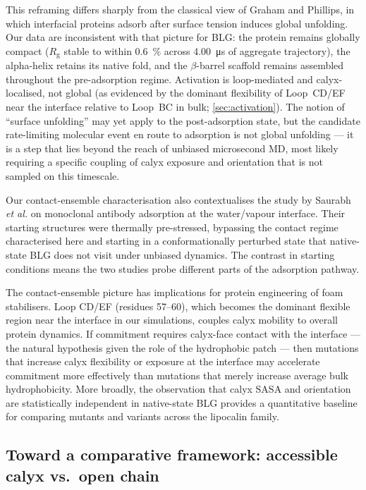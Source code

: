 \documentclass[11pt,a4paper]{article}
\begin{document}
This reframing differs sharply from the classical view of Graham and
Phillips, in which interfacial proteins adsorb after surface tension
induces global unfolding\citep{Graham1979}. Our data are inconsistent
with that picture for BLG: the protein remains globally compact
($R_\mathrm{g}$ stable to within \SI{0.6}{\percent} across
\SI{4.00}{\micro\second} of aggregate trajectory), the alpha-helix retains its native fold, and the
$\beta$-barrel scaffold remains assembled throughout the pre-adsorption
regime. Activation is loop-mediated and calyx-localised, not global (as
evidenced by the dominant flexibility of Loop~CD/EF near the
interface relative to Loop~BC in bulk; \cref{sec:activation}). The
notion of ``surface unfolding'' may yet apply to the post-adsorption
state, but the candidate rate-limiting molecular event en route to adsorption is
not global unfolding --- it is a step that lies beyond the reach of
unbiased microsecond MD, most likely requiring a specific coupling of
calyx exposure and orientation that is not sampled on this timescale.

Our contact-ensemble characterisation also contextualises the study by
Saurabh \textit{et al.}\citep{Saurabh2024} on monoclonal antibody
adsorption at the water/vapour interface. Their starting structures were
thermally pre-stressed, bypassing the contact regime characterised here
and starting in a conformationally perturbed state that native-state BLG
does not visit under unbiased dynamics. The contrast in starting
conditions means the two studies probe different parts of the adsorption
pathway.

The contact-ensemble picture has implications for protein engineering of
foam stabilisers. Loop CD/EF (residues 57--60), which becomes the dominant
flexible region near the interface in our simulations, couples calyx
mobility to overall protein dynamics. If commitment requires calyx-face
contact with the interface --- the natural hypothesis given the role of
the hydrophobic patch --- then mutations that increase calyx flexibility
or exposure at the interface may accelerate commitment more effectively
than mutations that merely increase average bulk hydrophobicity. More
broadly, the observation that calyx SASA and orientation are
statistically independent in native-state BLG provides a quantitative
baseline for comparing mutants and variants across the lipocalin
family\citep{Flower1996,Papiz1986}.

\subsection*{Toward a comparative framework: accessible calyx vs.\ open chain}
\end{document}
